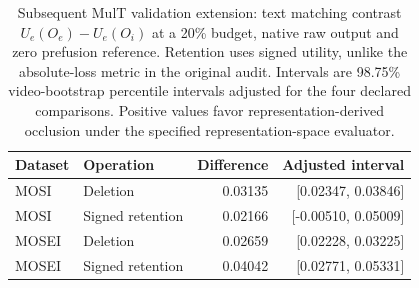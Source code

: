 \begin{table}[!htbp]
\centering\small
\caption{Subsequent MulT validation extension: text matching contrast $U_e(O_e)-U_e(O_i)$ at a 20\% budget, native raw output and zero prefusion reference. Retention uses signed utility, unlike the absolute-loss metric in the original audit. Intervals are 98.75\% video-bootstrap percentile intervals adjusted for the four declared comparisons. Positive values favor representation-derived occlusion under the specified representation-space evaluator.}\label{tab:mult-extension}
\begin{tabular}{llrr}
\toprule Dataset & Operation & Difference & Adjusted interval\\
\midrule
MOSI & Deletion & 0.03135 & [0.02347, 0.03846] \\
MOSI & Signed retention & 0.02166 & [-0.00510, 0.05009] \\
MOSEI & Deletion & 0.02659 & [0.02228, 0.03225] \\
MOSEI & Signed retention & 0.04042 & [0.02771, 0.05331] \\
\bottomrule
\end{tabular}
\end{table}
